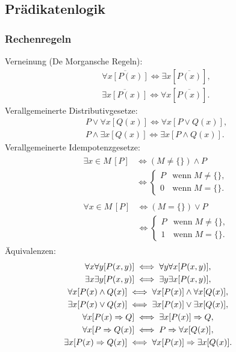 \vspace{1em}

\newpage
\subsection{Prädikatenlogik}
\subsubsection{Rechenregeln}
Verneinung (De Morgansche Regeln):
\begin{gather}
\overline{\forall x[P(x)]}\iff \exists x[\overline{P(x)}],\\
\overline{\exists x[P(x)]}\iff \forall x[\overline{P(x)}].
\end{gather}
Verallgemeinerte Distributivgesetze:
\begin{gather}
P\lor\forall x[Q(x)] \iff \forall x[P\lor Q(x)],\\
P\land\exists x[Q(x)] \iff \exists x[P\land Q(x)].
\end{gather}
Verallgemeinerte Idempotenzgesetze:
\begin{gather}
\begin{split}
\exists x{\in}M\,[P] & \iff
(M\ne\{\})\land P\\
& \iff\begin{cases}
P & \text{wenn}\; M\ne\{\},\\
0 & \text{wenn}\; M=\{\}.
\end{cases}
\end{split}\\
\begin{split}
\forall x{\in}M\,[P]& \iff
(M=\{\})\lor P\\
&\iff\begin{cases}
P & \text{wenn}\; M\ne\{\},\\
1 & \text{wenn}\; M=\{\}.
\end{cases}
\end{split}
\end{gather}
Äquivalenzen:
\begin{gather}
\hspace{-2em}\forall x\forall y[P(x,y)] \iff \forall y\forall x[P(x,y)],\\
\hspace{-2em}\exists x\exists y[P(x,y)] \iff \exists y\exists x[P(x,y)],\\
\hspace{-2em}\forall x[P(x)\land Q(x)] \iff \forall x[P(x)]\land\forall x[Q(x)],\\
\hspace{-2em}\exists x[P(x)\lor Q(x)] \iff \exists x[P(x)]\lor\exists x[Q(x)],\\
\hspace{-2em}\forall x[P(x)\Rightarrow Q] \iff \exists x[P(x)]\Rightarrow Q,\\
\hspace{-2em}\forall x[P\Rightarrow Q(x)] \iff P\Rightarrow\forall x[Q(x)],\\
\hspace{-2em}\exists x[P(x)\Rightarrow Q(x)]
  \iff\forall x[P(x)]\Rightarrow\exists x[Q(x)].
\end{gather}
